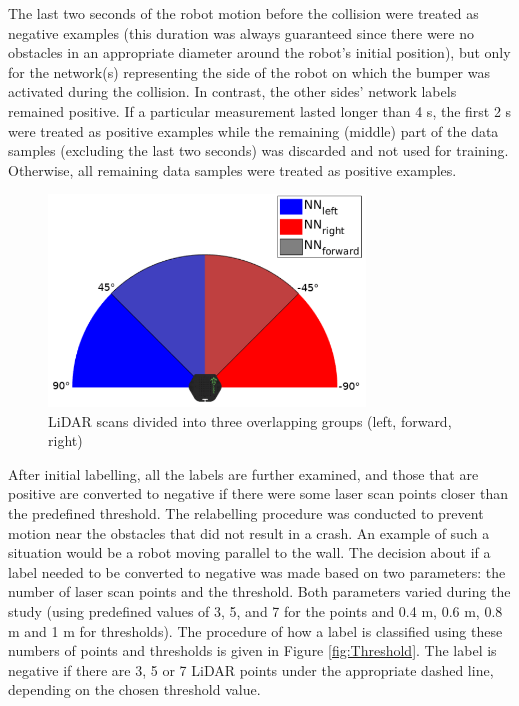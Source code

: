 The last two seconds of the robot motion before the collision were treated as negative examples (this duration was always guaranteed since there were no obstacles in an appropriate diameter around the robot's initial position), but only for the network(s) representing the side of the robot on which the bumper was activated during the collision. In contrast, the other sides' network labels remained positive. If a particular measurement lasted longer than 4 s, the first 2 s were treated as positive examples while the remaining (middle) part of the data samples (excluding the last two seconds) was discarded and not used for training. Otherwise, all remaining data samples were treated as positive examples.

\begin{figure}
    \centering
    \includegraphics[width=0.75\textwidth]{slike/Fig03_03.png}
    \caption{LiDAR scans divided into three overlapping groups (left, forward, right)}
    \label{fig:Fig03}
\end{figure}

After initial labelling, all the labels are further examined, and those that are positive are converted to negative if there were some laser scan points closer than the predefined threshold. The relabelling procedure was conducted to prevent motion near the obstacles that did not result in a crash. An example of such a situation would be a robot moving parallel to the wall. The decision about if a label needed to be converted to negative was made based on two parameters: the number of laser scan points and the threshold. Both parameters varied during the study (using predefined values of 3, 5, and 7 for the points and 0.4 m, 0.6 m, 0.8 m and 1 m for thresholds). The procedure of how a label is classified using these numbers of points and thresholds is given in Figure \ref{fig:Threshold}. The label is negative if there are 3, 5 or 7 LiDAR points under the appropriate dashed line, depending on the chosen threshold value. 

